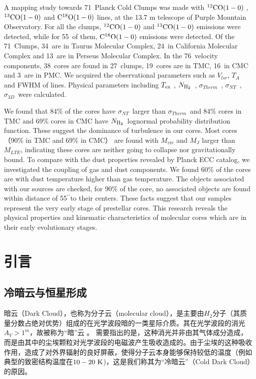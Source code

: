 \documentclass[UTF8, nocolorlinks]{pkuthss}
\newcommand{\coaa}{$\rm^{12}CO(1-0)$ }
\newcommand{\cobb}{$\rm^{13}CO(1-0)$ }
\newcommand{\cocc}{$\rm C^{18}O(1-0)$ }
\newcommand{\texc}{$T_{\rm {ex}}$ }
\newcommand{\nhyd}{$N_{\rm H_2}$\ }
\newcommand{\sigmath}{$\sigma _{Therm}$\ }
\newcommand{\sigmant}{$\sigma _{NT}$\ }
\newcommand{\sigmatd}{$\sigma _{3D}$\ }
\newcommand{\arcsec}{$^{\prime\prime}$}
\newcommand{\numsou}{71\ }
\newcommand{\numsoutmc}{34\ }
\newcommand{\numsoupmc}{13\ }
\newcommand{\numsoucmc}{24\ }
\newcommand{\numcore}{38\ }
\newcommand{\numcoretmc}{19\ }
\newcommand{\numcorepmc}{3\ }
\newcommand{\numcorecmc}{16\ }
\newcommand{\numcocc}{55\ }
\newcommand{\numcompofcores}{27\ }
\newcommand{\numvelcomp}{76\ }
\begin{document}
\begin{eabstract}

	A mapping study towards \numsou Planck Cold Clumps was made with \coaa, \cobb and \cocc lines, at the 13.7 m telescope of Purple Mountain Observatory. For all the clumps, \coaa and \cobb emissions were detected, while for \numcocc of them, \cocc emissions were detected.  Of the \numsou Clumps, \numsoutmc are in Taurus Molecular Complex, \numsoucmc in California  Molecular Complex and \numsoupmc are in Perseus Molecular Complex. In the \numvelcomp velocity components, \numcore cores are found in \numcompofcores clumps, \numcoretmc cores are in TMC, \numcorecmc in CMC and \numcorepmc are in PMC.
    We acquired the observational parameters such as $V_{lsr}$, $T_{A}$ and FWHM of lines. Physical parameters including \texc, \nhyd, \sigmath, \sigmant,  \sigmatd were calculated.

    We found that 84\% of the cores have \sigmant larger than \sigmath and 84\% cores in TMC and 69\% cores in CMC have \nhyd lognormal probability distribution function. These suggest the dominance of turbulence in our cores. Most cores （90\% in TMC and 69\% in CMC） are found with $M_{vir}$ and $M_J$ larger than $M_{LTE}$, indicating these cores are neither going to collapse nor gravitationally bound. To compare with the dust properties revealed by Planck ECC catalog, we investigated the coupling of gas and dust components. We found 60\% of the cores are with dust temperature higher than gas temperature. The objects associated with our sources are checked, for 90\% of the core, no associated objects are found within distance of 55\arcsec to their centers. These facts suggest that our samples represent the very early stage of prestellar cores. This research reveals the physical properties and kinematic characteristics of molecular cores which are in their early evolutionary stages.
\end{eabstract}

	\tableofcontents
	\mainmatter

\chapter{引言}

	\section{冷暗云与恒星形成}\label{Sec.ColdDarkCloud}

		暗云（Dark Cloud），也称为分子云（molecular cloud），是主要由$H_2$分子（其质量分数占绝对优势）组成的在光学波段暗的一类星际介质。其在光学波段的消光$A_V>1^{m}$，故被称为“暗”云\supercite{2007ARA&A..45..339B} 。 需要指出的是，这种消光并非由其气体成分造成，而是由其中的尘埃颗粒对光学波段的电磁波产生吸收造成的。由于尘埃的这种吸收作用，造成了对外界辐射的良好屏蔽，使得分子云本身能够保持较低的温度（例如典型的致密结构温度在$10-20\rm\ K$\supercite{1983ApJ...265..223B})，这是我们称其为“冷暗云”（Cold Dark Cloud）的原因。
\end{document}
